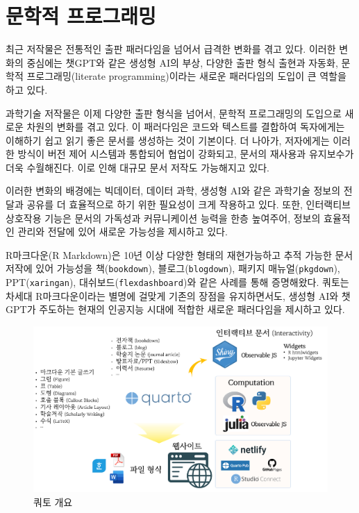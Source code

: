 \documentclass[
  letterpaper,
]{book}
\begin{document}
\hypertarget{uxbb38uxd559uxc801-uxd504uxb85cuxadf8uxb798uxbc0d}{%
\section{문학적
프로그래밍}\label{uxbb38uxd559uxc801-uxd504uxb85cuxadf8uxb798uxbc0d}}

최근 저작물은 전통적인 출판 패러다임을 넘어서 급격한 변화를 겪고 있다.
이러한 변화의 중심에는 챗GPT와 같은 생성형 AI의 부상, 다양한 출판 형식
출현과 자동화, 문학적 프로그래밍(literate programming)이라는 새로운
패러다임의 도입이 큰 역할을 하고 있다.

과학기술 저작물은 이제 다양한 출판 형식을 넘어서, 문학적 프로그래밍의
도입으로 새로운 차원의 변화를 겪고 있다. 이 패러다임은 코드와 텍스트를
결합하여 독자에게는 이해하기 쉽고 읽기 좋은 문서를 생성하는 것이
기본이다. 더 나아가, 저자에게는 이러한 방식이 버전 제어 시스템과
통합되어 협업이 강화되고, 문서의 재사용과 유지보수가 더욱 수월해진다.
이로 인해 대규모 문서 저작도 가능해지고 있다.

이러한 변화의 배경에는 빅데이터, 데이터 과학, 생성형 AI와 같은 과학기술
정보의 전달과 공유를 더 효율적으로 하기 위한 필요성이 크게 작용하고
있다. 또한, 인터랙티브 상호작용 기능은 문서의 가독성과 커뮤니케이션
능력을 한층 높여주어, 정보의 효율적인 관리와 전달에 있어 새로운 가능성을
제시하고 있다.

R마크다운(R Markdown)은 10년 이상 다양한 형태의 재현가능하고 추적 가능한
문서 저작에 있어 가능성을 책(\texttt{bookdown}),
블로그(\texttt{blogdown}), 패키지 매뉴얼(\texttt{pkgdown}),
PPT(\texttt{xaringan}), 대쉬보드(\texttt{flexdashboard})와 같은 사례를
통해 증명해왔다. 쿼토는 차세대 R마크다운이라는 별명에 걸맞게 기존의
장점을 유지하면서도, 생성형 AI와 챗GPT가 주도하는 현재의 인공지능 시대에
적합한 새로운 패러다임을 제시하고 있다.

\begin{figure}

{\centering \includegraphics{images/birds-eye-view.png}

}

\caption{쿼토 개요}

\end{figure}
\end{document}
